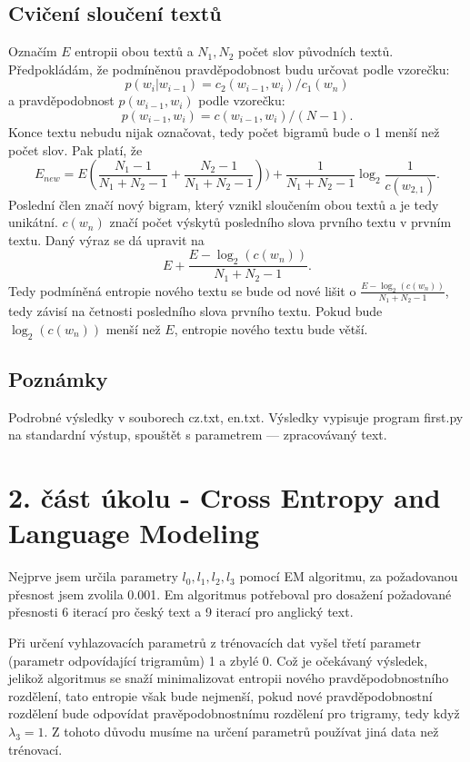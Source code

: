 \documentclass[12pt, a4paper]{report}
\theoremstyle{remark}
\begin{document}
\subsection*{Cvičení sloučení textů}
Označím $E$ entropii obou textů a $N_1,N_2$ počet slov původních textů. Předpokládám, že podmíněnou pravděpodobnost budu určovat podle vzorečku: $$p(w_i|w_{i-1})=c_2(w_{i-1},w_i)/c_1(w_{n})$$ a pravděpodobnost $p(w_{i-1},w_{i})$ podle vzorečku: $$p(w_{i-1},w_{i})=c(w_{i-1},w_{i})/(N-1).$$ Konce textu nebudu nijak označovat, tedy počet bigramů bude o 1 menší než počet slov. Pak platí, že 
$$ E_{new}= E(\frac{N_1-1}{N_1+N_2-1}+\frac{N_2-1}{N_1+N_2-1}))+\frac{1}{N_1+N_2-1}\log_2{\frac{1}{c(w_{2,1})}}. $$
Poslední člen značí nový bigram, který vznikl sloučením obou textů a je tedy unikátní. $c(w_n)$ značí počet výskytů posledního slova prvního textu v prvním textu. Daný výraz se dá upravit na
$$ E+\frac{E-\log_2(c(w_{n}))}{N_1+N_2-1}. $$
Tedy podmíněná entropie nového textu se bude od nové lišit o $\frac{E-\log_2(c(w_{n}))}{N_1+N_2-1}$, tedy závisí na četnosti posledního slova prvního textu. Pokud bude $\log_2(c(w_{n}))$ menší než $E$, entropie nového textu bude větší.

\subsection*{Poznámky}
Podrobné výsledky v souborech cz.txt, en.txt.
Výsledky vypisuje program first.py na standardní výstup, spouštět s parametrem --- zpracovávaný text.


\section*{2. část úkolu - Cross Entropy and Language Modeling}

Nejprve jsem určila parametry $l_0, l_1, l_2, l_3$ pomocí EM algoritmu, za požadovanou přesnost jsem zvolila 0.001. Em algoritmus potřeboval pro dosažení požadované přesnosti 6 iterací pro český text a 9 iterací pro anglický text.

Při určení vyhlazovacích parametrů z trénovacích dat vyšel třetí parametr (parametr odpovídající trigramům) 1 a zbylé 0. Což je očekávaný výsledek, jelikož algoritmus se snaží minimalizovat entropii nového pravděpodobnostního rozdělení, tato entropie však bude nejmenší, pokud nové pravděpodobnostní rozdělení bude odpovídat pravěpodobnostnímu rozdělení pro trigramy, tedy když $\lambda_3=1$. Z tohoto důvodu musíme na určení parametrů používat jiná data než trénovací.
\end{document}

